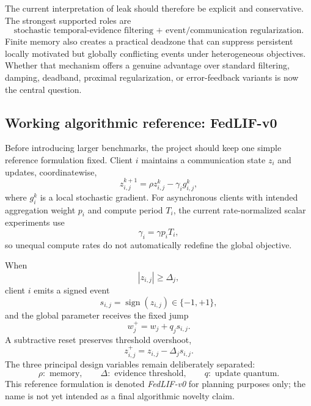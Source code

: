 The current interpretation of leak should therefore be explicit and conservative. The strongest supported roles are
\begin{equation}
  \boxed{\text{stochastic temporal-evidence filtering + event/communication regularization}.}
\end{equation}
Finite memory also creates a practical deadzone that can suppress persistent locally motivated but globally conflicting events under heterogeneous objectives. Whether that mechanism offers a genuine advantage over standard filtering, damping, deadband, proximal regularization, or error-feedback variants is now the central question.

\subsection{Working algorithmic reference: FedLIF-v0}

Before introducing larger benchmarks, the project should keep one simple reference formulation fixed. Client $i$ maintains a communication state $z_i$ and updates, coordinatewise,
\begin{equation}
  z_{i,j}^{k+1}=\rho z_{i,j}^{k}-\gamma_i g_{i,j}^{k},
\end{equation}
where $g_i^k$ is a local stochastic gradient. For asynchronous clients with intended aggregation weight $p_i$ and compute period $T_i$, the current rate-normalized scalar experiments use
\begin{equation}
  \gamma_i=\gamma p_iT_i,
\end{equation}
so unequal compute rates do not automatically redefine the global objective.

When
\begin{equation}
  |z_{i,j}|\geq\Delta_j,
\end{equation}
client $i$ emits a signed event
\begin{equation}
  s_{i,j}=\operatorname{sign}(z_{i,j})\in\{-1,+1\},
\end{equation}
and the global parameter receives the fixed jump
\begin{equation}
  w_j^+=w_j+q_js_{i,j}.
\end{equation}
A subtractive reset preserves threshold overshoot,
\begin{equation}
  z_{i,j}^+=z_{i,j}-\Delta_js_{i,j}.
\end{equation}
The three principal design variables remain deliberately separated:
\begin{equation}
  \boxed{\rho:\text{ memory},\qquad \Delta:\text{ evidence threshold},\qquad q:\text{ update quantum}.}
\end{equation}
This reference formulation is denoted \emph{FedLIF-v0} for planning purposes only; the name is not yet intended as a final algorithmic novelty claim.

